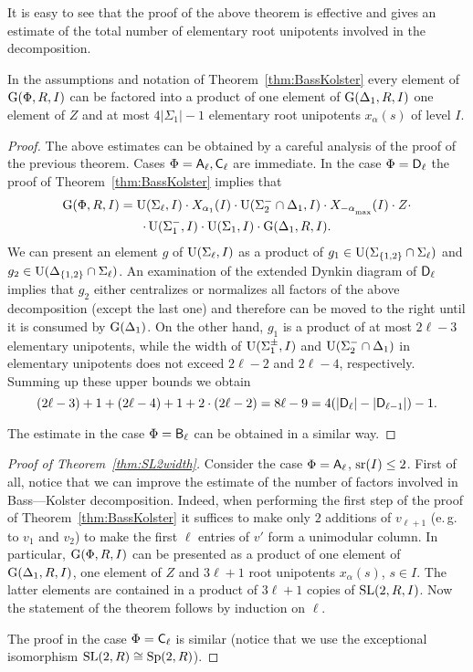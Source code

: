 It is easy to see that the proof of the above theorem is effective and gives an estimate of the total number of elementary root unipotents involved in the decomposition.
\begin{cor}
In the assumptions and notation of Theorem~\ref{thm:BassKolster} every element of $\operatorname{G}(\Phi,R,I)$ 
can be factored into a product of one element of $\operatorname{G}(\Delta_1,R,I)$ one element of $Z$ and at most $4|\Sigma_1|-1$ elementary root unipotents $x_\alpha(s)$ of level $I$. \end{cor}
\begin{proof}
The above estimates can be obtained by a careful analysis of the proof of the previous theorem.
Cases $\Phi=\mathsf{A}_\ell, \mathsf{C}_\ell$ are immediate.
In the case $\Phi=\mathsf{D}_\ell$ the proof of Theorem~\ref{thm:BassKolster} implies that
\begin{multline}\nonumber
\G(\Phi,R,I) =  \U(\Sigma_\ell,I) \cdot X_{\alpha_1}(I) \cdot \U(\Sigma_2^-\cap\Delta_1,I) \cdot X_{-\alpha\ssub{\mathrm{max}}}(I) \cdot Z  \cdot \\ \cdot \U(\Sigma_1^-,I) \cdot \U(\Sigma_1,I) \cdot \G(\Delta_1,R,I).
\end{multline}
We can present an element $g$ of $\operatorname{U}(\Sigma_\ell, I)$ as a product of $g_1 \in \operatorname{U}(\Sigma_{\{1,2\}} \cap \Sigma_\ell)$ and $g_2\in \operatorname{U}(\Delta_{\{1,2\}}\cap \Sigma_\ell)$.
An examination of the extended Dynkin diagram of $\mathsf{D}_\ell$ implies that $g_2$ either centralizes or normalizes all factors of the above decomposition (except the last one) and therefore can be moved to the right until it is consumed by $\operatorname{G}(\Delta_1)$.
On the other hand, $g_1$ is a product of at most $2\ell-3$ elementary unipotents, while the width of $\operatorname{U}(\Sigma_1^\pm, I)$ and $\operatorname{U}(\Sigma_2^-\cap\Delta_1)$ in elementary unipotents does not exceed $2\ell-2$ and $2\ell-4$, respectively.
Summing up these upper bounds we obtain
$$(2\ell-3) + 1 + (2\ell - 4) + 1 + 2\cdot (2\ell - 2) = 8\ell - 9 = 4(|\mathsf{D}_\ell| - |\mathsf{D}_{\ell-1}|) - 1.$$

The estimate in the case $\Phi=\mathsf{B}_\ell$ can be obtained in a similar way. \end{proof}

\begin{proof}[Proof of Theorem~\ref{thm:SL2width}]
Consider the case $\Phi=\mathsf{A}_\ell$, $\operatorname{sr}(I)\leq 2$. First of all, notice that we can improve the estimate of the number of factors involved in Bass---Kolster decomposition.
Indeed, when performing the first step of the proof of Theorem~\ref{thm:BassKolster} it suffices to make only $2$ additions of $v_{\ell+1}$ (e.\,g. to $v_{1}$ and $v_2$) to make the first $\ell$ entries of $v'$ form a unimodular column.
In particular, $\operatorname{G}(\Phi, R, I)$ can be presented as a product of one element of $\operatorname{G}(\Delta_1, R, I)$, one element of $Z$ and $3\ell+1$ root unipotents $x_\alpha(s)$, $s\in I$.
The latter elements are contained in a product of $3\ell + 1$ copies of $\operatorname{SL}(2, R, I)$. Now the statement of the theorem follows by induction on $\ell$.

The proof in the case $\Phi=\mathsf{C}_\ell$ is similar (notice that we use the exceptional isomorphism $\operatorname{SL}(2, R)\cong \operatorname{Sp}(2, R)$).
\end{proof}
